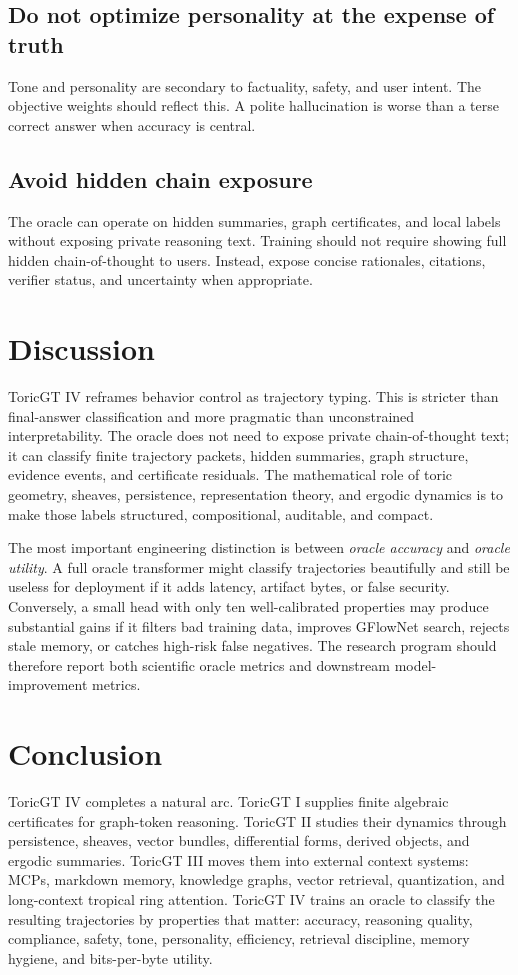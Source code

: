 \documentclass[11pt]{article}
\numberwithin{equation}{section}
\begin{document}
\subsection{Do not optimize personality at the expense of truth}
Tone and personality are secondary to factuality, safety, and user intent. The objective weights should reflect this. A polite hallucination is worse than a terse correct answer when accuracy is central.

\subsection{Avoid hidden chain exposure}
The oracle can operate on hidden summaries, graph certificates, and local labels without exposing private reasoning text. Training should not require showing full hidden chain-of-thought to users. Instead, expose concise rationales, citations, verifier status, and uncertainty when appropriate.


\section{Discussion}
ToricGT IV reframes behavior control as trajectory typing. This is stricter than final-answer classification and more pragmatic than unconstrained interpretability. The oracle does not need to expose private chain-of-thought text; it can classify finite trajectory packets, hidden summaries, graph structure, evidence events, and certificate residuals. The mathematical role of toric geometry, sheaves, persistence, representation theory, and ergodic dynamics is to make those labels structured, compositional, auditable, and compact.

The most important engineering distinction is between \emph{oracle accuracy} and \emph{oracle utility}. A full oracle transformer might classify trajectories beautifully and still be useless for deployment if it adds latency, artifact bytes, or false security. Conversely, a small head with only ten well-calibrated properties may produce substantial gains if it filters bad training data, improves GFlowNet search, rejects stale memory, or catches high-risk false negatives. The research program should therefore report both scientific oracle metrics and downstream model-improvement metrics.

\section{Conclusion}
ToricGT IV completes a natural arc. ToricGT I supplies finite algebraic certificates for graph-token reasoning. ToricGT II studies their dynamics through persistence, sheaves, vector bundles, differential forms, derived objects, and ergodic summaries. ToricGT III moves them into external context systems: MCPs, markdown memory, knowledge graphs, vector retrieval, quantization, and long-context tropical ring attention. ToricGT IV trains an oracle to classify the resulting trajectories by properties that matter: accuracy, reasoning quality, compliance, safety, tone, personality, efficiency, retrieval discipline, memory hygiene, and bits-per-byte utility.
\end{document}
